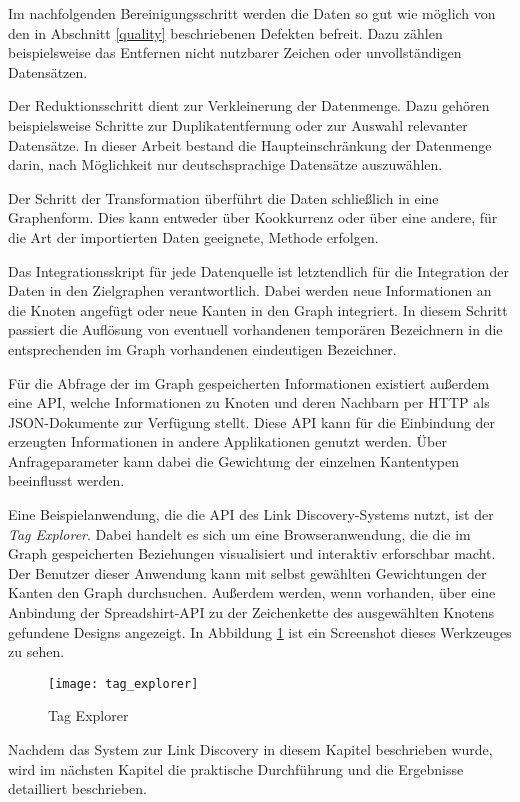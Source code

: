 Im nachfolgenden Bereinigungsschritt werden die Daten so gut wie möglich von den in Abschnitt \ref{quality} beschriebenen Defekten befreit. Dazu zählen beispielsweise das Entfernen nicht nutzbarer Zeichen oder unvollständigen Datensätzen.

Der Reduktionsschritt dient zur Verkleinerung der Datenmenge. Dazu gehören beispielsweise Schritte zur Duplikatentfernung oder zur Auswahl relevanter Datensätze. In dieser Arbeit bestand die Haupteinschränkung der Datenmenge darin, nach Möglichkeit nur deutschsprachige Datensätze auszuwählen.

Der Schritt der Transformation überführt die Daten schließlich in eine Graphenform. Dies kann entweder über Kookkurrenz oder über eine andere, für die Art der importierten Daten geeignete, Methode erfolgen.

Das Integrationsskript für jede Datenquelle ist letztendlich für die Integration der Daten in den Zielgraphen verantwortlich. Dabei werden neue Informationen an die Knoten angefügt oder neue Kanten in den Graph integriert. In diesem Schritt passiert die Auflösung von eventuell vorhandenen temporären Bezeichnern in die entsprechenden im Graph vorhandenen eindeutigen Bezeichner.

Für die Abfrage der im Graph gespeicherten Informationen existiert außerdem eine API, welche Informationen zu Knoten und deren Nachbarn per HTTP als JSON-Dokumente zur Verfügung stellt. Diese API kann für die Einbindung der erzeugten Informationen in andere Applikationen genutzt werden. Über Anfrageparameter kann dabei die Gewichtung der einzelnen Kantentypen beeinflusst werden.

Eine Beispielanwendung, die die API des Link Discovery-Systems nutzt, ist der \emph{Tag Explorer}. Dabei handelt es sich um eine Browseranwendung, die die im Graph gespeicherten Beziehungen visualisiert und interaktiv erforschbar macht. Der Benutzer dieser Anwendung kann mit selbst gewählten Gewichtungen der Kanten den Graph durchsuchen. Außerdem werden, wenn vorhanden, über eine Anbindung der Spreadshirt-API zu der Zeichenkette des ausgewählten Knotens gefundene Designs angezeigt. In Abbildung \ref{fig:tag_explorer} ist ein Screenshot dieses Werkzeuges zu sehen.

\begin{figure}
\centering
\texttt{[image: tag\_explorer]}
\caption{Tag Explorer}
\label{fig:tag_explorer}
\end{figure}

Nachdem das System zur Link Discovery in diesem Kapitel beschrieben wurde, wird im nächsten Kapitel die praktische Durchführung und die Ergebnisse detailliert beschrieben.